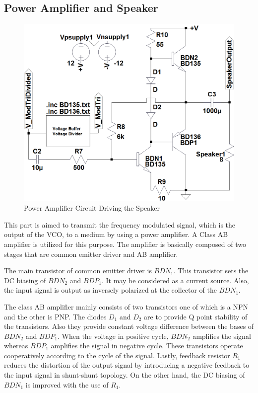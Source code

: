 \documentclass[paper]{IEEEtran}
\begin{document}
\subsection{Power Amplifier and Speaker}
\begin{figure}[b!]
 \setlength{\unitlength}{\textwidth}
 \center 
 \includegraphics[width=0.45\unitlength]{PowerAmp_Circuit_FinalModified}
 \caption{\label{fig:PowerAmp_Circuit}Power Amplifier Circuit Driving the Speaker}
\end{figure}
This part is aimed to transmit the frequency modulated signal, which is the output of the VCO, to a medium by using a power amplifier. A Class AB amplifier is utilized for this purpose. The amplifier is basically composed of two stages that are common emitter driver and AB amplifier.

The main transistor of common emitter driver is $BDN_{1}$. This transistor sets the DC biasing of $BDN_{2}$ and $BDP_{1}$. It may be considered as a current source. Also, the input signal is output as inversely polarized at the collector of the $BDN_{1}$.

The class AB amplifier mainly consists of two transistors one of which is a NPN and the other is PNP. The diodes $D_{1}$ and $D_{2}$ are to provide Q point stability of the transistors. Also they provide constant voltage difference between the bases of $BDN_{2}$ and $BDP_{1}$. When the voltage in positive cycle, $BDN_{2}$ amplifies the signal whereas $BDP_{1}$ amplifies the signal in negative cycle. These transistors operate cooperatively according to the cycle of the signal. Lastly, feedback resistor $R_{1}$ reduces the distortion of the output signal by introducing a negative feedback to the input signal in shunt-shunt topology. On the other hand, the DC biasing of $BDN_{1}$ is improved with the use of $R_{1}$.
\end{document}
